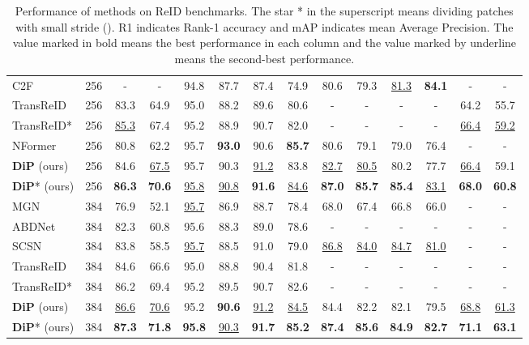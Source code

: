 \documentclass[10pt,twocolumn,letterpaper]{article}
\begin{document}
\begin{table*}
\begin{tabular}{@{}lccccccccccccc@{}}
    C2F\cite{zhang2021coarse} & 256 & - & - & 94.8 & 87.7 & 87.4 & 74.9 & 80.6 & 79.3 & \uline{81.3} & \textbf{84.1} & - & -\\
    TransReID\cite{He_2021_ICCV} & 256 & 83.3 & 64.9 & 95.0 & 88.2 & 89.6 & 80.6 & - & - & - & - & 64.2 & 55.7\\
    TransReID*\cite{He_2021_ICCV} & 256 & \uline{85.3} & 67.4 & 95.2 & 88.9 & 90.7 & 82.0 & - & - & - & - & \uline{66.4} & \uline{59.2}\\
    NFormer\cite{wang2022nformer} & 256 & 80.8 & 62.2 & 95.7 & \textbf{93.0} & 90.6 & \textbf{85.7} & 80.6 & 79.1 & 79.0 & 76.4 & - & -\\
    \textbf{DiP} (ours) & 256 & 84.6 & \uline{67.5} & 95.7 & 90.3 & \uline{91.2} & 83.8 & \uline{82.7} & \uline{80.5} & 80.2 & 77.7 & \uline{66.4} & 59.1\\
    \textbf{DiP}* (ours) & 256 & \textbf{86.3} &\textbf{70.6} & \uline{95.8} & \uline{90.8} & \textbf{91.6} & \uline{84.6} & \textbf{87.0} & \textbf{85.7} & \textbf{85.4} & \uline{83.1} & \textbf{68.0} & \textbf{60.8}\\
    \midrule
    MGN\cite{wang2018learning} & 384 & 76.9 & 52.1 & \uline{95.7} & 86.9 & 88.7 & 78.4 & 68.0 & 67.4 & 66.8 & 66.0 & - & -\\
    ABDNet\cite{chen2019abd} & 384 & 82.3 & 60.8 & 95.6 & 88.3 & 89.0 & 78.6 & - & - & - & - & - & - \\
    SCSN\cite{chen2020salience} & 384 & 83.8 & 58.5 & \uline{95.7} & 88.5 & 91.0 & 79.0 & \uline{86.8} & \uline{84.0} & \uline{84.7} & \uline{81.0} & - & - \\
    TransReID\cite{He_2021_ICCV} & 384 & 84.6 & 66.6 & 95.0 & 88.8 & 90.4 & 81.8 & - & - & - & - & - & - \\
    TransReID*\cite{He_2021_ICCV} & 384 & 86.2 & 69.4 & 95.2 & 89.5 & 90.7 & 82.6 & - & - & - & - & - & - \\
    \textbf{DiP} (ours) & 384 & \uline{86.6} & \uline{70.6} & 95.2 & \textbf{90.6} & \uline{91.2} & \uline{84.5} & 84.4 & 82.2 & 82.1 & 79.5 & \uline{68.8} & \uline{61.3}\\
    \textbf{DiP}* (ours) & 384 & \textbf{87.3} & \textbf{71.8} & \textbf{95.8} & \uline{90.3} & \textbf{91.7} & \textbf{85.2} & \textbf{87.4} & \textbf{85.6} & \textbf{84.9} & \textbf{82.7} & \textbf{71.1} & \textbf{63.1}\\
    \bottomrule
  \end{tabular}
  \caption{Performance of methods on ReID benchmarks. The star * in the superscript means dividing patches with small stride (). R1 indicates Rank-1 accuracy and mAP indicates mean Average Precision. The value marked in bold means the best performance in each column and the value marked by underline means the second-best performance.}
  \label{tab:performance}
\end{table*}
\end{document}
